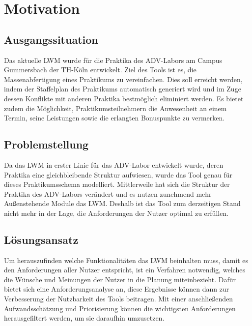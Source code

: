 \chapter{Motivation}

\section{Ausgangssituation}

Das aktuelle \ac{LWM} wurde für die Praktika des ADV-Labors am Campus Gummersbach der TH-Köln entwickelt. Ziel des Tools ist es, die Massenabfertigung eines Praktikums zu vereinfachen. Dies soll erreicht werden, indem der Staffelplan des Praktikums automatisch generiert wird und im Zuge dessen Konflikte mit anderen Praktika bestmöglich eliminiert werden. Es bietet zudem die Möglichkeit, Praktikumsteilnehmern die Anwesenheit an einem Termin, seine Leistungen sowie die erlangten Bonuspunkte zu vermerken.

\section{Problemstellung}

Da das \ac{LWM} in erster Linie für das ADV-Labor entwickelt wurde, deren Praktika eine gleichbleibende Struktur aufwiesen, wurde das Tool genau für dieses Praktikumsschema modelliert. Mittlerweile hat sich die Struktur der Praktika des ADV-Labors verändert und es nutzen zunehmend mehr Außenstehende Module das LWM. Deshalb ist das Tool zum derzeitigen Stand nicht mehr in der Lage, die Anforderungen der Nutzer optimal zu erfüllen.

\section{Lösungsansatz}

Um herauszufinden welche Funktionalitäten das \ac{LWM} beinhalten muss, damit es den Anforderungen aller Nutzer entspricht, ist ein Verfahren notwendig, welches die Wünsche und Meinungen der Nutzer in die Planung miteinbezieht. Dafür bietet sich eine Anforderungsanalyse an, diese Ergebnisse können dann zur Verbesserung der Nutzbarkeit des Tools beitragen. Mit einer anschließenden Aufwandsschätzung und Priorisierung können die wichtigsten Anforderungen herausgefiltert werden, um sie daraufhin umzusetzen.





